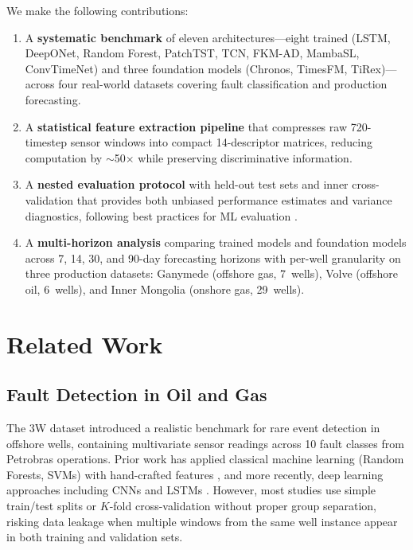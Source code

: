 \documentclass[conference]{IEEEtran}
\begin{document}
We make the following contributions:

\begin{enumerate}
    \item A \textbf{systematic benchmark} of eleven architectures---eight trained (LSTM, DeepONet, Random Forest, PatchTST, TCN, FKM-AD, MambaSL, ConvTimeNet) and three foundation models (Chronos, TimesFM, TiRex)---across four real-world datasets covering fault classification and production forecasting.
    \item A \textbf{statistical feature extraction pipeline} that compresses raw 720-timestep sensor windows into compact 14-descriptor matrices, reducing computation by $\sim$50$\times$ while preserving discriminative information.
    \item A \textbf{nested evaluation protocol} with held-out test sets and inner cross-validation that provides both unbiased performance estimates and variance diagnostics, following best practices for ML evaluation \cite{cawley2010over}.
    \item A \textbf{multi-horizon analysis} comparing trained models and foundation models across 7, 14, 30, and 90-day forecasting horizons with per-well granularity on three production datasets: Ganymede (offshore gas, 7~wells), Volve (offshore oil, 6~wells), and Inner Mongolia (onshore gas, 29~wells).
\end{enumerate}

\section{Related Work}
\label{sec:related}

\subsection{Fault Detection in Oil and Gas}

The 3W dataset \cite{3w} introduced a realistic benchmark for rare event detection in offshore wells, containing multivariate sensor readings across 10 fault classes from Petrobras operations. Prior work has applied classical machine learning (Random Forests, SVMs) with hand-crafted features \cite{3w_ml}, and more recently, deep learning approaches including CNNs and LSTMs \cite{3w_dl}. However, most studies use simple train/test splits or $K$-fold cross-validation without proper group separation, risking data leakage when multiple windows from the same well instance appear in both training and validation sets.
\end{document}
